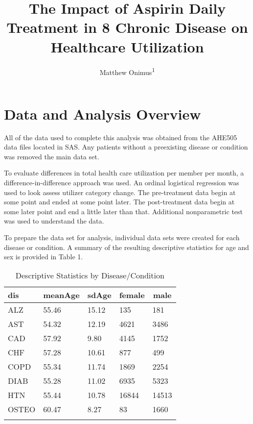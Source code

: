 \documentclass[
  english,
  man]{apa6}
\title{The Impact of Aspirin Daily Treatment in 8 Chronic Disease on Healthcare Utilization}
\author{Matthew Onimus\textsuperscript{1}}
\date{}
\affiliation{\vspace{0.5cm}\textsuperscript{1} Merck \& Co C/O Jefferson Univserity}
\begin{document}
\maketitle

\hypertarget{data-and-analysis-overview}{%
\section{Data and Analysis Overview}\label{data-and-analysis-overview}}

All of the data used to complete this analysis was obtained from the AHE505 data files located in SAS. Any patients without a preexisting disease or condition was removed the main data set.

To evaluate differences in total health care utilization per member per month, a difference-in-difference approach was used. An ordinal logistical regression was used to look assess utilizer category change. The pre-treatment data begin at some point and ended at some point later. The post-treatment data begin at some later point and end a little later than that. Additional nonparametric test was used to understand the data.

To prepare the data set for analysis, individual data sets were created for each disease or condition. A summary of the resulting descriptive statistics for age and sex is provided in Table 1.

\begin{table}[tbp]

\begin{center}
\begin{threeparttable}

\caption{\label{tab:table1}Descriptive Statistics by Disease/Condition}

\begin{tabular}{lllll}
\toprule{}
dis & \multicolumn{1}{c}{meanAge} & \multicolumn{1}{c}{sdAge} & \multicolumn{1}{c}{female} & \multicolumn{1}{c}{male}\\
\midrule{}
ALZ & 55.46 & 15.12 & 135 & 181\\
AST & 54.32 & 12.19 & 4621 & 3486\\
CAD & 57.92 & 9.80 & 4145 & 1752\\
CHF & 57.28 & 10.61 & 877 & 499\\
COPD & 55.34 & 11.74 & 1869 & 2254\\
DIAB & 55.28 & 11.02 & 6935 & 5323\\
HTN & 55.44 & 10.78 & 16844 & 14513\\
OSTEO & 60.47 & 8.27 & 83 & 1660\\
\bottomrule{}
\end{tabular}

\end{threeparttable}
\end{center}

\end{table}
\end{document}
